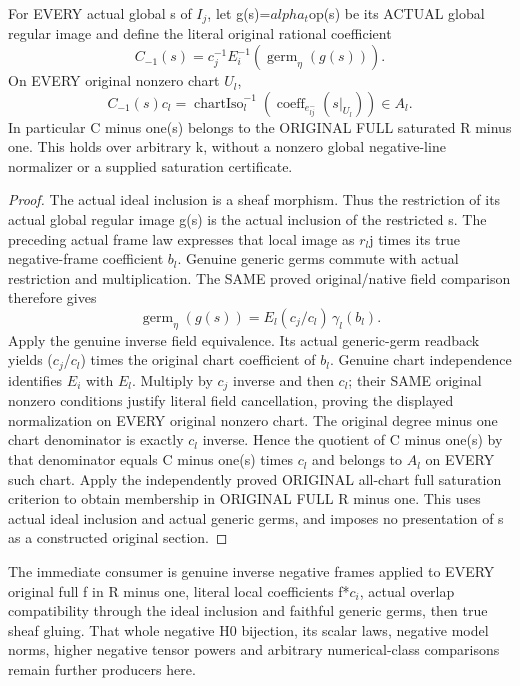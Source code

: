 \begin{theorem}
\label{thm:seven-native-negative-global-original-coefficient}
\leanok
For EVERY actual global s of $I_j$, let g(s)=$alpha_t$op(s) be its ACTUAL
global regular image and define the literal original rational coefficient
\[
 C_{-1}(s)=c_j^{-1}E_i^{-1}(\operatorname{germ}_\eta(g(s))).
\]
On EVERY original nonzero chart $U_l$,
\[
 C_{-1}(s)c_l=\operatorname{chartIso}_l^{-1}
       (\operatorname{coeff}_{e^-_{lj}}(s|_{U_l}))\in A_l.
\]
In particular C minus one(s) belongs to the ORIGINAL FULL saturated
R minus one. This holds over arbitrary k, without a nonzero global
negative-line normalizer or a supplied saturation certificate.
\end{theorem}
\begin{proof}
The actual ideal inclusion is a sheaf morphism. Thus the restriction of
its actual global regular image g(s) is the actual inclusion of the
restricted s. The preceding actual frame law expresses that local image
as $r_l$j times its true negative-frame coefficient $b_l$. Genuine generic
germs commute with actual restriction and multiplication. The SAME
proved original/native field comparison therefore gives
\[
 \operatorname{germ}_\eta(g(s))=E_l(c_j/c_l)\,\gamma_l(b_l).
\]
Apply the genuine inverse field equivalence. Its actual generic-germ
readback yields ($c_j$/$c_l$) times the original chart coefficient of $b_l$.
Genuine chart independence identifies $E_i$ with $E_l$. Multiply by $c_j$
inverse and then $c_l$; their SAME original nonzero conditions justify
literal field cancellation, proving the displayed normalization on EVERY
original nonzero chart. The original degree minus one chart denominator
is exactly $c_l$ inverse. Hence the quotient of C minus one(s) by that
denominator equals C minus one(s) times $c_l$ and belongs to $A_l$ on EVERY
such chart. Apply the independently proved ORIGINAL all-chart full
saturation criterion to obtain membership in ORIGINAL FULL R minus one.
This uses actual ideal inclusion and actual generic germs, and imposes
no presentation of s as a constructed original section.
\end{proof}

The immediate consumer is genuine inverse negative frames applied to
EVERY original full f in R minus one, literal local coefficients f*$c_i$,
actual overlap compatibility through the ideal inclusion and faithful
generic germs, then true sheaf gluing. That whole negative H0 bijection,
its scalar laws, negative model norms, higher negative tensor powers and
arbitrary numerical-class comparisons remain further producers here.

